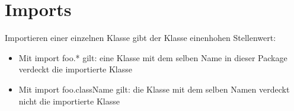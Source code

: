 \documentclass[UTF8]{article}
\begin{document}
\section{Imports}

Importieren einer einzelnen Klasse gibt der Klasse einenhohen Stellenwert:

\begin{itemize}
    \item Mit import foo.* gilt: eine Klasse mit dem selben Name in dieser Package verdeckt die importierte Klasse
    \item Mit import foo.className gilt: die Klasse mit dem selben Namen verdeckt nicht die importierte Klasse
\end{itemize}
\end{document}
